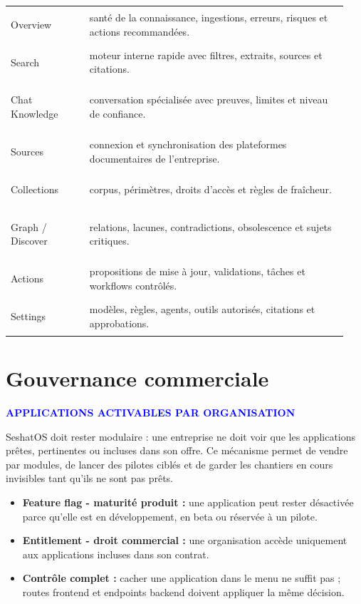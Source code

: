 \documentclass[11pt,a4paper]{article}
\newcommand{\eyebrow}[1]{\textcolor{blue}{\footnotesize\textbf{\MakeUppercase{#1}}}\par\vspace{3pt}}
\begin{document}
\begin{tabular}{>{\bfseries\raggedright\arraybackslash}p{0.22\linewidth} >{\raggedright\arraybackslash}p{0.72\linewidth}}
Overview & santé de la connaissance, ingestions, erreurs, risques et actions recommandées.\\
Search & moteur interne rapide avec filtres, extraits, sources et citations.\\
Chat Knowledge & conversation spécialisée avec preuves, limites et niveau de confiance.\\
Sources & connexion et synchronisation des plateformes documentaires de l'entreprise.\\
Collections & corpus, périmètres, droits d'accès et règles de fraîcheur.\\
Graph / Discover & relations, lacunes, contradictions, obsolescence et sujets critiques.\\
Actions & propositions de mise à jour, validations, tâches et workflows contrôlés.\\
Settings & modèles, règles, agents, outils autorisés, citations et approbations.\\
\end{tabular}

\section{Gouvernance commerciale}
\eyebrow{Applications activables par organisation}
SeshatOS doit rester modulaire : une entreprise ne doit voir que les applications prêtes, pertinentes ou incluses dans son offre. Ce mécanisme permet de vendre par modules, de lancer des pilotes ciblés et de garder les chantiers en cours invisibles tant qu'ils ne sont pas prêts.

\begin{itemize}
  \item \textbf{Feature flag - maturité produit :} une application peut rester désactivée parce qu'elle est en développement, en beta ou réservée à un pilote.
  \item \textbf{Entitlement - droit commercial :} une organisation accède uniquement aux applications incluses dans son contrat.
  \item \textbf{Contrôle complet :} cacher une application dans le menu ne suffit pas ; routes frontend et endpoints backend doivent appliquer la même décision.
\end{itemize}
\end{document}
